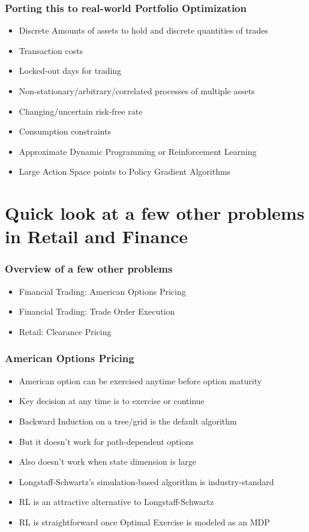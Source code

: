 \documentclass[handout]{beamer}
\begin{document}
\begin{frame}
\frametitle{Porting this to real-world Portfolio Optimization}
\pause
\begin{itemize}[<+->]
\item Discrete Amounts of assets to hold and discrete quantities of trades
\item Transaction costs
\item Locked-out days for trading
\item Non-stationary/arbitrary/correlated processes of multiple assets
\item Changing/uncertain risk-free rate
\item Consumption constraints
\item Approximate Dynamic Programming or Reinforcement Learning
\item Large Action Space points to Policy Gradient Algorithms
\end{itemize}
\end{frame}

\section{Quick look at a few other problems in Retail and Finance}

\begin{frame}
\frametitle{Overview of a few other problems}
\pause
\begin{itemize}[<+->]
\item Financial Trading: American Options Pricing
\item Financial Trading: Trade Order Execution
\item Retail: Clearance Pricing 
\end{itemize}
\end{frame}

\begin{frame}
\frametitle{American Options Pricing}
\pause
\begin{itemize}[<+->]
\item American option can be exercised anytime before option maturity
\item Key decision at any time is to exercise or continue
\item Backward Induction on a tree/grid is the default algorithm
\item But it doesn't work for path-dependent options 
\item Also doesn't work when state dimension is large
\item Longstaff-Schwartz's simulation-based algorithm is industry-standard
\item RL is an attractive alternative to Longstaff-Schwartz
\item RL is straightforward once Optimal Exercise is modeled as an MDP
\end{itemize}
\end{frame}
\end{document}
